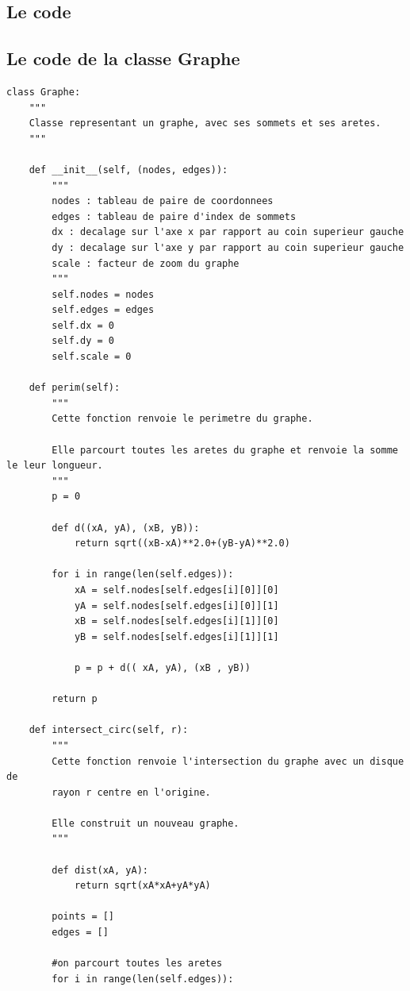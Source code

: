 \documentclass{book}
\begin{document}
\begin{appendices}
\section{Le code}
\subsection{Le code de la classe Graphe}
\begin{lstlisting}
class Graphe:
    """
    Classe representant un graphe, avec ses sommets et ses aretes. 
    """
    
    def __init__(self, (nodes, edges)):
        """
        nodes : tableau de paire de coordonnees
        edges : tableau de paire d'index de sommets
        dx : decalage sur l'axe x par rapport au coin superieur gauche
        dy : decalage sur l'axe y par rapport au coin superieur gauche
        scale : facteur de zoom du graphe
        """
        self.nodes = nodes
        self.edges = edges
        self.dx = 0
        self.dy = 0
        self.scale = 0
        
    def perim(self):
        """
        Cette fonction renvoie le perimetre du graphe.
        
        Elle parcourt toutes les aretes du graphe et renvoie la somme le leur longueur.
        """
        p = 0
        
        def d((xA, yA), (xB, yB)):
            return sqrt((xB-xA)**2.0+(yB-yA)**2.0)
        
        for i in range(len(self.edges)):
            xA = self.nodes[self.edges[i][0]][0]
            yA = self.nodes[self.edges[i][0]][1]
            xB = self.nodes[self.edges[i][1]][0]
            yB = self.nodes[self.edges[i][1]][1]
            
            p = p + d(( xA, yA), (xB , yB))
        
        return p
        
    def intersect_circ(self, r):
        """
        Cette fonction renvoie l'intersection du graphe avec un disque de 
        rayon r centre en l'origine.
        
        Elle construit un nouveau graphe.
        """
                
        def dist(xA, yA):
            return sqrt(xA*xA+yA*yA)
            
        points = []
        edges = []
        
        #on parcourt toutes les aretes
        for i in range(len(self.edges)):
            

\end{lstlisting}
\end{appendices}
\end{document}
